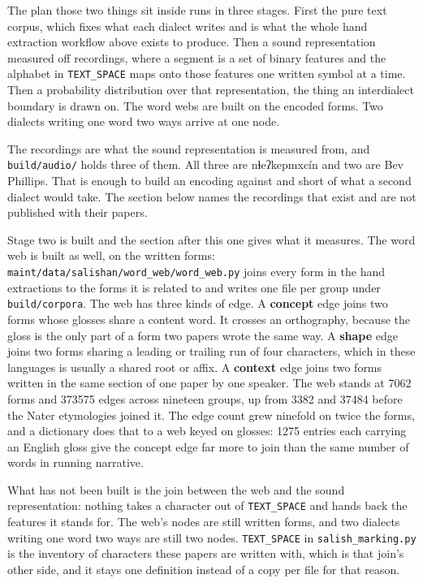 The plan those two things sit inside runs in three stages. First the pure text corpus, which fixes what each dialect writes and is what the whole hand extraction workflow above exists to produce. Then a sound representation measured off recordings, where a segment is a set of binary features and the alphabet in \texttt{TEXT\_\allowbreak{}SPACE} maps onto those features one written symbol at a time. Then a probability distribution over that representation, the thing an interdialect boundary is drawn on. The word webs are built on the encoded forms. Two dialects writing one word two ways arrive at one node.

The recordings are what the sound representation is measured from, and \texttt{build/\allowbreak{}audio/\allowbreak{}} holds three of them. All three are nɬeʔkepmxcín and two are Bev Phillips. That is enough to build an encoding against and short of what a second dialect would take. The section below names the recordings that exist and are not published with their papers.

Stage two is built and the section after this one gives what it measures. The word web is built as well, on the written forms: \texttt{maint/\allowbreak{}data/\allowbreak{}salishan/\allowbreak{}word\_\allowbreak{}web/\allowbreak{}word\_\allowbreak{}web.\allowbreak{}py} joins every form in the hand extractions to the forms it is related to and writes one file per group under \texttt{build/\allowbreak{}corpora}. The web has three kinds of edge. A \textbf{concept} edge joins two forms whose glosses share a content word. It crosses an orthography, because the gloss is the only part of a form two papers wrote the same way. A \textbf{shape} edge joins two forms sharing a leading or trailing run of four characters, which in these languages is usually a shared root or affix. A \textbf{context} edge joins two forms written in the same section of one paper by one speaker. The web stands at 7062 forms and 373575 edges across nineteen groups, up from 3382 and 37484 before the Nater etymologies joined it. The edge count grew ninefold on twice the forms, and a dictionary does that to a web keyed on glosses: 1275 entries each carrying an English gloss give the concept edge far more to join than the same number of words in running narrative.

What has not been built is the join between the web and the sound representation: nothing takes a character out of \texttt{TEXT\_\allowbreak{}SPACE} and hands back the features it stands for. The web's nodes are still written forms, and two dialects writing one word two ways are still two nodes. \texttt{TEXT\_\allowbreak{}SPACE} in \texttt{salish\_\allowbreak{}marking.\allowbreak{}py} is the inventory of characters these papers are written with, which is that join's other side, and it stays one definition instead of a copy per file for that reason.

